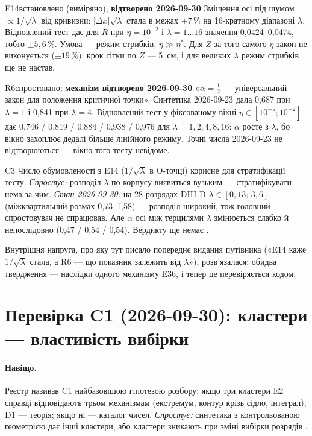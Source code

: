 \begin{itemcard}{E14}{встановлено (виміряно); \textbf{відтворено 2026-09-30}}
Зміщення осі під шумом $\propto1/\sqrt\lambda$ від кривизни: $|\Delta x|\sqrt\lambda$
стала в межах $\pm7\,\%$ на 16-кратному діапазоні $\lambda$. Відновлений тест дає для
$R$ при $\eta=10^{-2}$ і $\lambda=1\ldots16$ значення 0,0424--0,0474, тобто $\pm5{,}6\,\%$.
Умова --- режим стрибків, $\eta\gg\eta^{*}$. Для $Z$ за того самого $\eta$ закон не
виконується ($\pm19\,\%$): крок сітки по $Z$ --- 5~см, і для великих $\lambda$ режим стрибків
ще не настав.
\end{itemcard}
\begin{itemcard}{R6}{спростовано; \textbf{механізм відтворено 2026-09-30}}
«$\alpha=\tfrac12$ --- універсальний закон для положення критичної точки». Синтетика
2026-09-23 дала 0,687 при $\lambda=1$ і 0,841 при $\lambda=4$. Відновлений тест у
фіксованому вікні $\eta\in[10^{-5};10^{-2}]$ дає 0,746 / 0,819 / 0,884 / 0,938 / 0,976
для $\lambda=1,2,4,8,16$: $\alpha$ росте з $\lambda$, бо вікно захоплює дедалі більше
лінійного режиму. Точні числа 2026-09-23 не відтворюються --- вікно того тесту невідоме.
\end{itemcard}
\begin{conjecture}{C3}
Число обумовленості з E14 ($1/\sqrt\lambda$ в O-точці) корисне для стратифікації тесту.
\emph{Спростує:} розподіл $\lambda$ по корпусу виявиться вузьким --- стратифікувати нема за
чим. \emph{Стан 2026-09-30:} на 28 розрядах DIII-D $\lambda\in[0{,}13;\,3{,}6]$ (міжквартильний
розмах 0,73--1,58) --- розподіл широкий, тож головний спростовувач не спрацював. Але $\alpha$
осі між терцилями $\lambda$ змінюється слабко й непослідовно (0,47 / 0,54 / 0,54). Вердикту
ще немає \cite{RegConj}.
\end{conjecture}
\noindent Внутрішня напруга, про яку тут писало попереднє видання путівника («E14 каже
$1/\sqrt\lambda$ стала, а R6 --- що показник залежить від $\lambda$»), розв'язалася: обидва
твердження --- наслідки одного механізму E36, і тепер це перевіряється кодом.

\section{Перевірка C1 (2026-09-30): кластери --- властивість вибірки}\label{sec:g02-c1}

\paragraph{Навіщо.} Реєстр називав C1 найбазовішою гіпотезою розбору: якщо три кластери E2
справді відповідають трьом механізмам (екстремум, контур крізь сідло, інтеграл), D1 ---
теорія; якщо ні --- каталог чисел. \emph{Спростує:} синтетика з контрольованою геометрією дає
інші кластери, або кластери зникають при зміні вибірки розрядів \cite{RegConj}.

